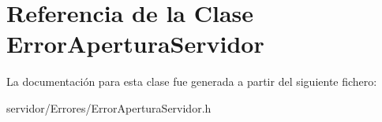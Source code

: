 \hypertarget{classErrorAperturaServidor}{\section{\-Referencia de la \-Clase \-Error\-Apertura\-Servidor}
\label{classErrorAperturaServidor}
}


\-La documentación para esta clase fue generada a partir del siguiente fichero\-:\begin{DoxyCompactItemize}
\item 
servidor/\-Errores/\-Error\-Apertura\-Servidor.\-h\end{DoxyCompactItemize}
